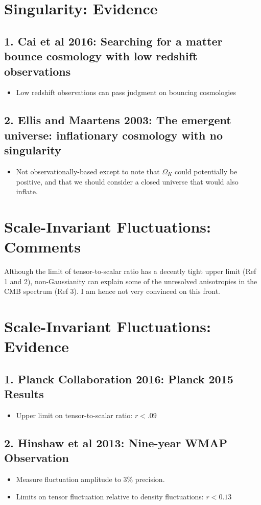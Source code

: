 \documentclass{article}
\begin{document}
\newpage
\section*{Singularity: Evidence}
\subsection*{1. Cai et al 2016: Searching for a matter bounce cosmology with low redshift observations}
\begin{itemize}
\item Low redshift observations can pass judgment on bouncing cosmologies
\end{itemize}

\subsection*{2. Ellis and Maartens 2003: The emergent universe: inflationary cosmology with no singularity}
\begin{itemize}
\item Not observationally-based except to note that $\Omega_K$ could potentially be positive, and that we should consider a closed universe that would also inflate.
\end{itemize}

\newpage
\section{Scale-Invariant Fluctuations: Comments}
Although the limit of tensor-to-scalar ratio has a decently tight upper limit (Ref 1 and 2), non-Gaussianity can explain some of the unresolved anisotropies in the CMB spectrum (Ref 3). I am hence not very convinced on this front. 

\newpage
\section*{Scale-Invariant Fluctuations: Evidence}
\subsection*{1. Planck Collaboration 2016: Planck 2015 Results}
\begin{itemize}
\item Upper limit on tensor-to-scalar ratio: $r<.09$
\end{itemize}

\subsection*{2. Hinshaw et al 2013: Nine-year WMAP Observation}
\begin{itemize}
\item Measure fluctuation amplitude to 3\% precision.
\item Limits on tensor fluctuation relative to density fluctuations: $r<0.13$
\end{itemize}
\end{document}

